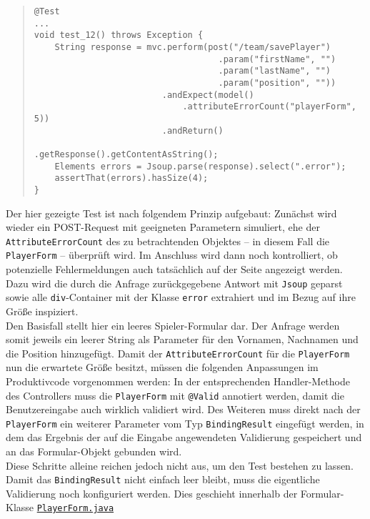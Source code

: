 \begin{quote}
\begin{verbatim}
@Test
...
void test_12() throws Exception {
    String response = mvc.perform(post("/team/savePlayer")
                                    .param("firstName", "")
                                    .param("lastName", "")
                                    .param("position", ""))
                         .andExpect(model()
                             .attributeErrorCount("playerForm", 5))
                         .andReturn()
                             .getResponse().getContentAsString();
    Elements errors = Jsoup.parse(response).select(".error");
    assertThat(errors).hasSize(4);
}
\end{verbatim}
\end{quote}

Der hier gezeigte Test ist nach folgendem Prinzip aufgebaut: Zunächst wird wieder 
ein POST-Request mit geeigneten Parametern simuliert, ehe der 
\texttt{AttributeErrorCount} des zu betrachtenden Objektes -- in diesem Fall die 
\texttt{PlayerForm} -- überprüft wird. Im Anschluss wird dann noch kontrolliert, ob 
potenzielle Fehlermeldungen auch tatsächlich auf der Seite angezeigt werden. Dazu wird 
die durch die Anfrage zurückgegebene Antwort mit \texttt{Jsoup} geparst sowie alle 
\texttt{div}-Container mit der Klasse \texttt{error} extrahiert und im Bezug auf ihre 
Größe inspiziert. \\ 
Den Basisfall stellt hier ein leeres Spieler-Formular dar. Der Anfrage werden somit 
jeweils ein leerer String als Parameter für den Vornamen, Nachnamen und die Position 
hinzugefügt. Damit der \texttt{AttributeErrorCount} für die \texttt{PlayerForm} nun die 
erwartete Größe besitzt, müssen die folgenden Anpassungen im Produktivcode vorgenommen 
werden: In der entsprechenden Handler-Methode des Controllers muss die 
\texttt{PlayerForm} mit \texttt{@Valid} annotiert werden, damit die Benutzereingabe auch 
wirklich validiert wird. Des Weiteren muss direkt nach der \texttt{PlayerForm} ein 
weiterer Parameter vom Typ \texttt{BindingResult} eingefügt werden, in dem das Ergebnis 
der auf die Eingabe angewendeten Validierung gespeichert und an das Formular-Objekt 
gebunden wird. \\ 
Diese Schritte alleine reichen jedoch nicht aus, um den Test bestehen zu lassen. 
Damit das \texttt{BindingResult} nicht einfach leer bleibt, muss die eigentliche 
Validierung noch konfiguriert werden. Dies geschieht innerhalb der Formular-Klasse 
\href{https://github.com/FlorianOhmes/bat_spielzeitenplaner/blob/main/spielzeitenplaner/src/main/java/de/bathesis/spielzeitenplaner/web/forms/PlayerForm.java}{\texttt{PlayerForm.java}} 
